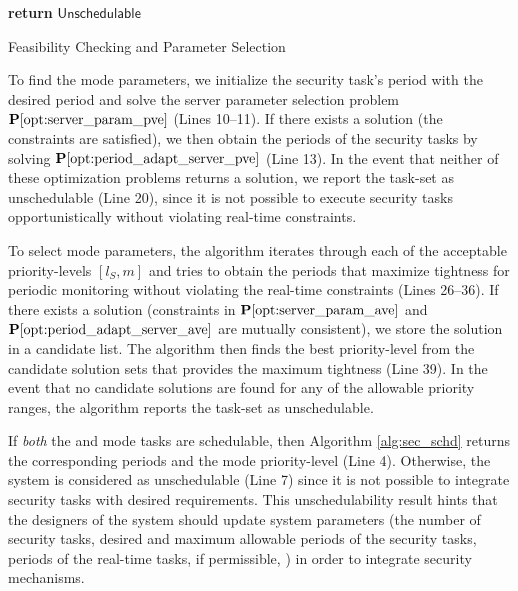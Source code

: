 \documentclass[../rt_server_main.tex]{subfiles}
\begin{document}
\begin{algorithm}[!ht]
\begin{algorithmic}[1]
\begin{ALC@g}
                    \ELSE
\STATE {}	                   \STATE \textbf{return} $\mathsf{Unschedulable}$          
                    \ENDIF
  
 \end{ALC@g}
 
    \STATE 
    \EndFunction
			\end{algorithmic}
            
            


            
			\caption{Feasibility Checking and Parameter Selection}
			\label{alg:sec_schd}
		\end{algorithm}
		




To find the \pve mode parameters, we initialize the security task's period with the desired period and solve the server parameter selection problem $\mathbf{P}\mathbf{\ref{opt:server_param_pve}}$ (Lines 10--11). If there exists a solution (\eg the constraints are satisfied), we then obtain the periods of the security tasks by solving $\mathbf{P}\mathbf{\ref{opt:period_adapt_server_pve}}$ (Line 13). In the event that neither of these optimization problems returns a solution, we report the task-set as unschedulable (Line 20), since it is not possible to execute security tasks opportunistically without violating real-time constraints.

To select \ave mode parameters, the algorithm iterates through each of the acceptable priority-levels $[l_S,m]$ 
and tries to obtain the periods that maximize tightness for periodic monitoring without violating the real-time constraints (Lines 26--36). 
If there exists a solution (\eg constraints in $\mathbf{P}\mathbf{\ref{opt:server_param_ave}}$ and $\mathbf{P}\mathbf{\ref{opt:period_adapt_server_ave}}$ are mutually consistent), we store the 
solution in a candidate list. The algorithm then finds the best priority-level from the candidate solution sets that provides the maximum tightness (Line 39). 
In the event that no candidate solutions are found for any of the allowable priority ranges, the algorithm reports the task-set as unschedulable.

If \textit{both} the \pve and \ave mode tasks are schedulable, then Algorithm \ref{alg:sec_schd} returns the corresponding periods and the \ave mode priority-level (Line 4). Otherwise, the system is considered as unschedulable (Line 7) since it is not possible to integrate security tasks with desired requirements. This unschedulability result hints that the designers of the system should update system parameters (\eg the number of security tasks, desired and maximum allowable periods of the security tasks, periods of the real-time tasks, if permissible, \etc) in order to integrate security mechanisms.



 
\end{document}
